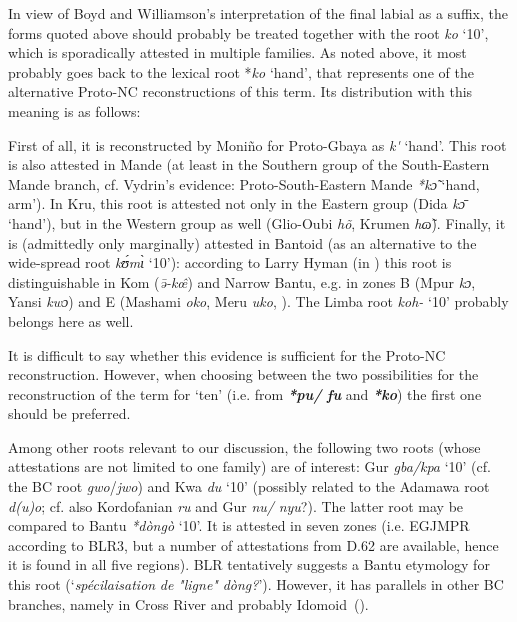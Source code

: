 In view of Boyd and Williamson’s interpretation of the final labial as a suffix, the forms quoted above should probably be treated together with the root \textit{ko} ‘10’, which is sporadically attested in multiple families. As noted above, it most probably goes back to the lexical root *\textit{ko} ‘hand’, that represents one of the alternative Proto-NC reconstructions of this term. Its distribution with this meaning is as follows:

First of all, it is reconstructed by Moniño for Proto-Gbaya as \textit{k{\'{}}} ‘hand’. This root is also attested in Mande (at least in the Southern group of the South-Eastern Mande branch, cf. Vydrin’s evidence: Proto-South-Eastern Mande  \textit{*k{\~{ɔ}}} ‘hand, arm’). In Kru, this root is attested not only in the Eastern group (Dida \textit{k{\={ɔ}}} ‘hand’), but in the Western group as well (Glio-Oubi \textit{h{\~{o}}}, Krumen \textit{h{\~{ɷ}}{\textprimstress}}). Finally, it is (admittedly only marginally) attested in Bantoid (as an alternative to the wide-spread root \textit{k{\'{ʊ}}m{\`{ɩ}}} ‘10’): according to Larry Hyman (in \citealt{Paulin1995}) this root is distinguishable in Kom (\textit{{\={ə}}-k{\^{œ}}}) and Narrow Bantu, e.g. in zones B (Mpur \textit{kɔ}, Yansi \textit{kwɔ}) and E (Mashami \textit{oko}, Meru \textit{uko}, \citealt{NursePhilippson1975}). The Limba root \textit{koh-} ‘10’ probably belongs here as well. 

It is difficult to say whether this evidence is sufficient for the Proto-NC reconstruction. However, when choosing between the two possibilities for the reconstruction of the term for ‘ten’ (i.e. from \textbf{\textit{*pu/} \textit{fu}} and \textbf{\textit{*ko}}) the first one should be preferred.

Among other roots relevant to our discussion, the following two roots (whose attestations are not limited to one family) are of interest: Gur \textit{gba/kpa} ‘10’ (cf. the BC root \textit{gwo}/\textit{jwo}) and Kwa \textit{du} ‘10’ (possibly related to the Adamawa root \textit{d(u)o}; cf. also Kordofanian \textit{ru} and Gur \textit{nu/} \textit{nyu}?). The latter root may be compared to Bantu \textit{*dòngò} ‘10’. It is attested in seven zones (i.e. EGJMPR according to BLR3, but a number of attestations from D.62 are available, hence it is found in all five regions). BLR tentatively suggests a Bantu etymology for this root (‘\textit{spécilaisation} \textit{de} \textit{"ligne"} \textit{dòng?}’). However, it has parallels in other BC branches, namely in Cross River \citep{Connell1991} and probably Idomoid~().

